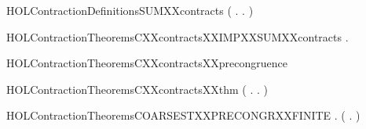 \begin{SaveVerbatim}{HOLContractionDefinitionsSUMXXcontracts}
\HOLTokenTurnstile{}  \HOLSymConst{=} (\HOLTokenLambda{} . \HOLSymConst{\HOLTokenForall{}}.  \HOLSymConst{\ensuremath{+}}    \HOLSymConst{\ensuremath{+}} )
\end{SaveVerbatim}
\newcommand{\HOLContractionDefinitionsSUMXXcontracts}{\UseVerbatim{HOLContractionDefinitionsSUMXXcontracts}}
\newcommand{\HOLContractionDefinitions}{
\HOLDfnTag{Contraction}{C_contracts}\HOLContractionDefinitionsCXXcontracts
\HOLDfnTag{Contraction}{CONTRACTION}\HOLContractionDefinitionsCONTRACTION
\HOLDfnTag{Contraction}{contracts_def}\HOLContractionDefinitionscontractsXXdef
\HOLDfnTag{Contraction}{OBS_contracts}\HOLContractionDefinitionsOBSXXcontracts
\HOLDfnTag{Contraction}{SUM_contracts}\HOLContractionDefinitionsSUMXXcontracts
}
\begin{SaveVerbatim}{HOLContractionTheoremsCXXcontractsXXIMPXXSUMXXcontracts}
\HOLTokenTurnstile{} \HOLSymConst{\HOLTokenForall{}} .    \HOLSymConst{\HOLTokenImp{}}   
\end{SaveVerbatim}
\newcommand{\HOLContractionTheoremsCXXcontractsXXIMPXXSUMXXcontracts}{\UseVerbatim{HOLContractionTheoremsCXXcontractsXXIMPXXSUMXXcontracts}}
\begin{SaveVerbatim}{HOLContractionTheoremsCXXcontractsXXprecongruence}
\HOLTokenTurnstile{}  
\end{SaveVerbatim}
\newcommand{\HOLContractionTheoremsCXXcontractsXXprecongruence}{\UseVerbatim{HOLContractionTheoremsCXXcontractsXXprecongruence}}
\begin{SaveVerbatim}{HOLContractionTheoremsCXXcontractsXXthm}
\HOLTokenTurnstile{}  \HOLSymConst{=} (\HOLTokenLambda{} . \HOLSymConst{\HOLTokenForall{}}.   \HOLSymConst{\HOLTokenImp{}}     )
\end{SaveVerbatim}
\newcommand{\HOLContractionTheoremsCXXcontractsXXthm}{\UseVerbatim{HOLContractionTheoremsCXXcontractsXXthm}}
\begin{SaveVerbatim}{HOLContractionTheoremsCOARSESTXXPRECONGRXXFINITE}
\HOLTokenTurnstile{} \HOLSymConst{\HOLTokenForall{}} .
         \HOLSymConst{\HOLTokenConj{}}   \HOLSymConst{\HOLTokenImp{}}
       (   \HOLSymConst{\HOLTokenEquiv{}} \HOLSymConst{\HOLTokenForall{}}.  \HOLSymConst{\ensuremath{+}}    \HOLSymConst{\ensuremath{+}} )
\end{SaveVerbatim}
